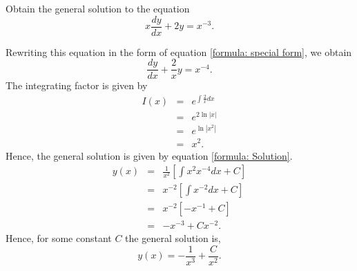 \documentclass[11pt]{article}
\begin{document}
\begin{problem}
Obtain the general solution to the equation
\begin{equation}
      x \dfrac{ dy }{dx}+ 2 y = x^{-3}.
\end{equation}
\end{problem}
\begin{solution}
Rewriting this equation in the form of equation \eqref{formula: special form}, we obtain
\begin{equation*}
\dfrac{ dy }{dx}+ \frac{2}{x} y = x^{-4}.
\end{equation*}
The integrating factor is given by 
\begin{eqnarray*}
I(x) & = & e^{\int  \frac{2 }{x} dx} \\
& = & e^{2\ln|x|} \\
& = & e^{\ln|x^{2}|} \\
& = & x^{2}.
\end{eqnarray*}
Hence, the general solution is given by equation \eqref{formula: Solution}.
\begin{eqnarray*}
y(x) & = & \frac{1}{x^{2}} \left[ \int x^{2} x^{-4} dx + C \right]\\
& = & x^{-2} \left[ \int x^{-2} dx + C \right]\\
& = & x^{-2} \left[ -x^{-1} + C \right]\\
& = &  -x^{-3} + C x^{-2}.
\end{eqnarray*}
Hence, for some constant $C$ the general solution is,
\begin{equation*}
     \boxed{y(x) = -\dfrac{1}{x^{3}} + \dfrac{C}{x^{2}}}.
\end{equation*}
\end{solution}
\end{document}
